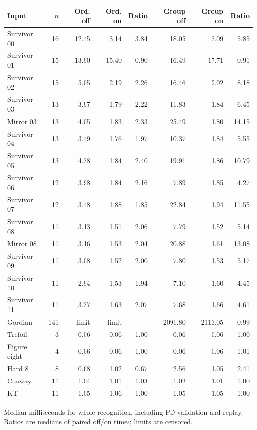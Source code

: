\begin{center}\small
\begin{tabular}{@{}lrrrrrrr@{}}
\toprule
Input & $n$ & Ord. off & Ord. on & Ratio & Group off & Group on & Ratio \\
\midrule
Survivor 00 & 16 & 12.45 & 3.14 & 3.84 & 18.05 & 3.09 & 5.85 \\
Survivor 01 & 15 & 13.90 & 15.40 & 0.90 & 16.49 & 17.71 & 0.91 \\
Survivor 02 & 15 & 5.05 & 2.19 & 2.26 & 16.46 & 2.02 & 8.18 \\
Survivor 03 & 13 & 3.97 & 1.79 & 2.22 & 11.83 & 1.84 & 6.45 \\
Mirror 03 & 13 & 4.05 & 1.83 & 2.33 & 25.49 & 1.80 & 14.15 \\
Survivor 04 & 13 & 3.49 & 1.76 & 1.97 & 10.37 & 1.84 & 5.55 \\
Survivor 05 & 13 & 4.38 & 1.84 & 2.40 & 19.91 & 1.86 & 10.79 \\
Survivor 06 & 12 & 3.98 & 1.84 & 2.16 & 7.89 & 1.85 & 4.27 \\
Survivor 07 & 12 & 3.48 & 1.88 & 1.85 & 22.84 & 1.94 & 11.55 \\
Survivor 08 & 11 & 3.13 & 1.51 & 2.06 & 7.79 & 1.52 & 5.14 \\
Mirror 08 & 11 & 3.16 & 1.53 & 2.04 & 20.88 & 1.61 & 13.08 \\
Survivor 09 & 11 & 3.08 & 1.52 & 2.00 & 7.80 & 1.53 & 5.17 \\
Survivor 10 & 11 & 2.94 & 1.53 & 1.94 & 7.10 & 1.60 & 4.45 \\
Survivor 11 & 11 & 3.37 & 1.63 & 2.07 & 7.68 & 1.66 & 4.61 \\
Gordian & 141 & limit & limit & -- & 2091.80 & 2113.05 & 0.99 \\
Trefoil & 3 & 0.06 & 0.06 & 1.00 & 0.06 & 0.06 & 1.00 \\
Figure eight & 4 & 0.06 & 0.06 & 1.00 & 0.06 & 0.06 & 1.01 \\
Hard 8 & 8 & 0.68 & 1.02 & 0.67 & 2.56 & 1.05 & 2.41 \\
Conway & 11 & 1.04 & 1.01 & 1.03 & 1.02 & 1.01 & 1.00 \\
KT & 11 & 1.05 & 1.06 & 1.00 & 1.05 & 1.05 & 1.00 \\
\bottomrule
\end{tabular}
\end{center}
Median milliseconds for whole recognition, including PD validation and replay. Ratios are medians of paired off/on times; limits are censored.

